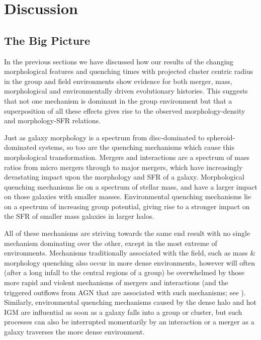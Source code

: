 \chapter{Discussion}

\section{The Big Picture}\label{sec:bigpic}

In the previous sections we have discussed how our results of the changing morphological features and quenching times with projected cluster centric radius in the group and field environments show evidence for both merger, mass, morphological and environmentally driven evolutionary histories. This suggests that not one mechanism is dominant in the group environment but that a superposition of all these effects gives rise to the observed morphology-density and morphology-SFR relations.

Just as galaxy morphology is a spectrum from disc-dominated to spheroid-dominated systems, so too are the quenching mechanisms which cause this morphological transformation. Mergers and interactions are a spectrum of mass ratios from micro mergers \citep{carlin16} through to major mergers, which have increasingly devastating impact upon the morphology and SFR of a galaxy. Morphological quenching mechanisms lie on a spectrum of stellar mass, and have a larger impact on those galaxies with smaller masses. Environmental quenching mechanisms lie on a spectrum of increasing group potential, giving rise to a stronger impact on the SFR of smaller mass galaxies in larger halos.  

All of these mechanisms are striving towards the same end result with no single mechanism dominating over the other, except in the most extreme of environments. Mechanisms traditionally associated with the field, such as mass \& morphology quenching also occur in more dense environments, however will often (after a long infall to the central regions of a group) be overwhelmed by those more rapid and violent mechanisms of mergers and interactions (and the triggered outflows from AGN that are associated with such mechanisms; see \citealt{smethurst16}). Similarly, environmental quenching mechanisms caused by the dense halo and hot IGM are influential as soon as a galaxy falls into a group or cluster, but such processes can also be interrupted momentarily by an interaction or a merger as a galaxy traverses the more dense environment.   

